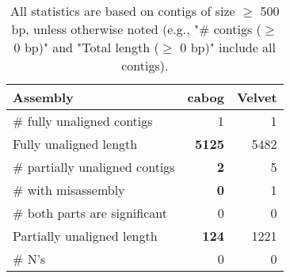 \documentclass[12pt,a4paper]{article}
\begin{document}
\begin{table}[ht]
\begin{center}
\caption{All statistics are based on contigs of size $\geq$ 500 bp, unless otherwise noted (e.g., "\# contigs ($\geq$ 0 bp)" and "Total length ($\geq$ 0 bp)" include all contigs).}
\begin{tabular}{|l*{2}{|r}|}
\hline
Assembly & cabog & Velvet \\ \hline
\# fully unaligned contigs & 1 & 1 \\ \hline
Fully unaligned length & {\bf 5125} & 5482 \\ \hline
\# partially unaligned contigs & {\bf 2} & 5 \\ \hline
\hspace{5mm}\# with misassembly & {\bf 0} & 1 \\ \hline
\hspace{5mm}\# both parts are significant & 0 & 0 \\ \hline
Partially unaligned length & {\bf 124} & 1221 \\ \hline
\# N's & 0 & 0 \\ \hline
\end{tabular}
\end{center}
\end{table}
\end{document}
